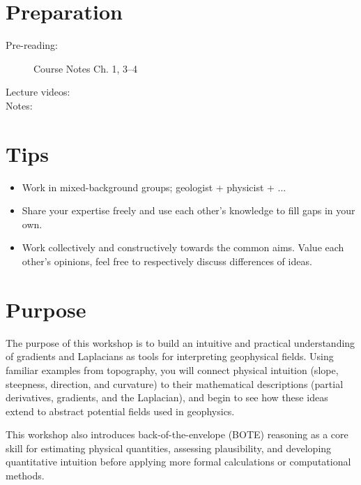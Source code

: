 
\workshopstart

\vspace{-0.75em}
\section*{Preparation}

\begin{description}
  \item[Pre-reading:] Course Notes Ch. 1, 3--4
  \item[Lecture videos:]
  \item[Notes:]
\end{description}

\section*{Tips}
\begin{itemize}
  \item Work in mixed-background groups; geologist + physicist + ...
  \item Share your expertise freely and use each other's knowledge to fill gaps in your own.
  \item Work collectively and constructively towards the common aims.  Value each other's opinions, feel free to respectively discuss differences of ideas. 
\end{itemize}

\section*{Purpose}

The purpose of this workshop is to build an intuitive and practical understanding of gradients and Laplacians as tools for interpreting geophysical fields. Using familiar examples from topography, you will connect physical intuition (slope, steepness, direction, and curvature) to their mathematical descriptions (partial derivatives, gradients, and the Laplacian), and begin to see how these ideas extend to abstract potential fields used in geophysics.

This workshop also introduces back-of-the-envelope (BOTE) reasoning as a core skill for estimating physical quantities, assessing plausibility, and developing quantitative intuition before applying more formal calculations or computational methods.

